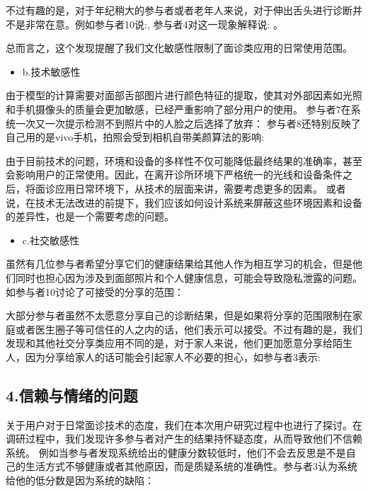 不过有趣的是，对于年纪稍大的参与者或者老年人来说，对于伸出舌头进行诊断并不是非常在意。例如参与者10说:, 参与者4对这一现象解释说: 。 

总而言之，这个发现提醒了我们文化敏感性限制了面诊类应用的日常使用范围。


\begin{itemize}
\item b.技术敏感性
\end{itemize}


由于模型的计算需要对面部舌部图片进行颜色特征的提取，使其对外部因素如光照和手机摄像头的质量会更加敏感，已经严重影响了部分用户的使用。
参与者7在系统一次又一次提示检测不到照片中的人脸之后选择了放弃：
参与者8还特别反映了自己用的是vivo手机，拍照会受到相机自带美颜算法的影响: 

由于目前技术的问题，环境和设备的多样性不仅可能降低最终结果的准确率，甚至会影响用户的正常使用。因此，在离开诊所环境下严格统一的光线和设备条件之后，将面诊应用日常环境下，从技术的层面来讲，需要考虑更多的因素。
或者说，在技术无法改进的前提下，我们应该如何设计系统来屏蔽这些环境因素和设备的差异性，也是一个需要考虑的问题。

\begin{itemize}
\item c.社交敏感性
\end{itemize}


虽然有几位参与者希望分享它们的健康结果给其他人作为相互学习的机会，但是他们同时也担心因为涉及到面部照片和个人健康信息，可能会导致隐私泄露的问题。
如参与者10讨论了可接受的分享的范围：

大部分参与者虽然不太愿意分享自己的诊断结果，但是如果将分享的范围限制在家庭或者医生圈子等可信任的人之内的话，他们表示可以接受。不过有趣的是，我们发现和其他社交分享类应用不同的是，对于家人来说，他们更加愿意分享给陌生人，因为分享给家人的话可能会引起家人不必要的担心，如参与者3表示: 


\subsection{4.信赖与情绪的问题}
关于用户对于日常面诊技术的态度，我们在本次用户研究过程中也进行了探讨。在调研过程中，我们发现许多参与者对产生的结果持怀疑态度，从而导致他们不信赖系统。
例如当参与者发现系统给出的健康分数较低时，他们不会去反思是不是自己的生活方式不够健康或者其他原因，而是质疑系统的准确性。参与者3认为系统给他的低分数是因为系统的缺陷：

